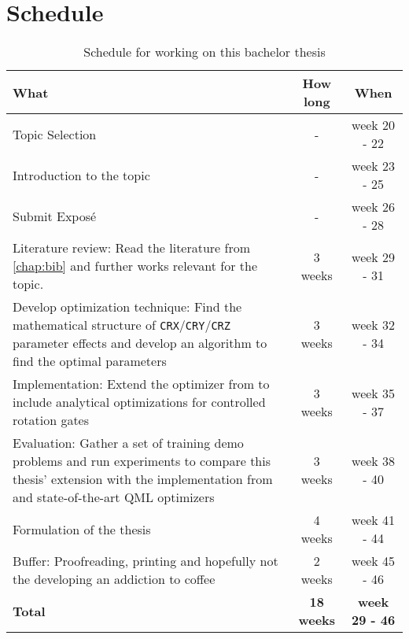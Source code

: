 \chapter{Schedule}
\label{chap:sched}

\begin{table}[h] %
    \centering
    \begin{tabularx}{0.95\textwidth}{X | c | c}
        \textbf{What} & \textbf{How long} & \textbf{When} \\
        \hline
        Topic Selection
            & -
            & week 20 - 22 \\
        \rule{0pt}{3ex
        }Introduction to the topic
            & -
            & week 23 - 25 \\
        \rule{0pt}{3ex
        }Submit Exposé
            & -
            & week 26 - 28 \\
        \hline
        Literature review: Read the literature from \autoref{chap:bib}
            and further works relevant for the topic. 
            & 3 weeks
            & week 29 - 31 \\
        \rule{0pt}{3ex
        }Develop optimization technique:
            Find the mathematical structure of
            \texttt{CRX}/\texttt{CRY}/\texttt{CRZ} parameter effects and develop
            an algorithm to find the optimal parameters
            & 3 weeks
            & week 32 - 34 \\
        \rule{0pt}{3ex
        }Implementation:
            Extend the optimizer from \cite{wendenius_gradient-free_2023} to
            include analytical optimizations for controlled rotation gates
            & 3 weeks
            & week 35 - 37 \\
        \rule{0pt}{3ex
        }Evaluation:
            Gather a set of training demo problems and run experiments to
            compare this thesis' extension with the implementation from
            \cite{wendenius_gradient-free_2023} and state-of-the-art QML
            optimizers
            & 3 weeks
            & week 38 - 40 \\
        \rule{0pt}{3ex
        }Formulation of the thesis
            & 4 weeks
            & week 41 - 44 \\
        \rule{0pt}{3ex
        }Buffer:
            Proofreading, printing and hopefully not the developing an addiction
            to coffee
            & 2 weeks
            & week 45 - 46 \\
        \hline
        \textbf{Total} & \textbf{18 weeks} & \textbf{week 29 - 46}
    \end{tabularx}
    \caption{Schedule for working on this bachelor thesis}
    \label{tab:schedule}
\end{table}